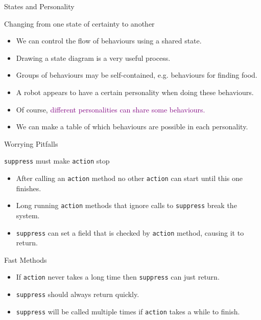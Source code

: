 \documentclass[color=pdftex,usenames,dvipsnames, aspectratio=169]{beamer}
\begin{document}
\begin{frame}{States and Personality}
\begin{block}{Changing from one state of certainty to another}
\begin{itemize}
\item \textcolor{OliveGreen}{We can control the flow of behaviours using a shared state.}
\item \alert{Drawing a state diagram is a very useful process.}
\item Groups of behaviours may be self-contained, e.g. behaviours for finding food.
\item A robot appears to have a certain \alert{personality} when doing these behaviours.
\item Of course, \textcolor{purple}{different personalities can share some behaviours.}
\item \textcolor{OliveGreen}{We can make a table of which behaviours are possible in each personality.}
\end{itemize}
\end{block}
\end{frame}


\begin{frame}{Worrying Pitfalls}

\begin{block}{\lstinline[identifierstyle=\bfseries\color{yellow}]!suppress! must make \lstinline[identifierstyle=\bfseries\color{yellow}]!action! stop}
\begin{itemize}
\item After calling an \lstinline!action! method no other \lstinline!action! can start until this one finishes.

\item Long running \lstinline!action! methods that ignore calls to \lstinline!suppress! break the system.

\item  \lstinline!suppress!  can set a field that is checked by \lstinline!action! method, causing it to return.
\end{itemize}
\end{block}
\begin{block}{Fast Methods}
\begin{itemize}
\item If \lstinline!action! never takes a long time then \lstinline!suppress! can just return.

\item \textcolor{BrickRed}{\lstinline!suppress! should always return quickly.}

\item \lstinline!suppress! will be called multiple times if \lstinline!action! takes a while to finish.
\end{itemize}
\end{block}
\end{frame}
\end{document}
